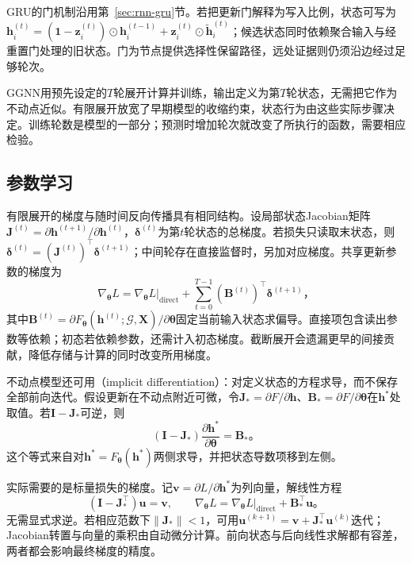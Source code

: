 GRU的门机制沿用第~\ref{sec:rnn-gru}节。若把更新门解释为写入比例，状态可写为$\bm{h}_i^{(t)}=(\bm{1}-\bm{z}_i^{(t)})\odot\bm{h}_i^{(t-1)}+\bm{z}_i^{(t)}\odot\widetilde{\bm{h}}_i^{(t)}$；候选状态同时依赖聚合输入与经重置门处理的旧状态。门为节点提供选择性保留路径，远处证据则仍须沿边经过足够轮次。

GGNN用预先设定的$T$轮展开计算并训练，输出定义为第$T$轮状态，无需把它作为不动点近似。有限展开放宽了早期模型的收缩约束，状态行为由这些实际步骤决定。训练轮数是模型的一部分；预测时增加轮次就改变了所执行的函数，需要相应检验。

\subsection{参数学习}
\label{sec:gnn-recurrent-learning}

有限展开的梯度与随时间反向传播具有相同结构。设局部状态Jacobian矩阵$\bm{J}^{(t)}=\partial\bm{h}^{(t+1)}/\partial\bm{h}^{(t)}$，$\bm{\delta}^{(t)}$为第$t$轮状态的总梯度。若损失只读取末状态，则$\bm{\delta}^{(t)}=(\bm{J}^{(t)})^{\top}\bm{\delta}^{(t+1)}$；中间轮存在直接监督时，另加对应梯度。共享更新参数的梯度为
\begin{equation}
  \nabla_{\bm{\theta}}L
    =\left.\nabla_{\bm{\theta}}L\right|_{\mathrm{direct}}
      +\sum_{t=0}^{T-1}(\bm{B}^{(t)})^{\top}\bm{\delta}^{(t+1)}\text{，}
  \label{eq:gnn-recurrent-gradient}
\end{equation}
其中$\bm{B}^{(t)}=\partial F_{\bm{\theta}}(\bm{h}^{(t)};\mathcal{G},\bm{X})/\partial\bm{\theta}$固定当前输入状态求偏导。直接项包含读出参数等依赖；初态若依赖参数，还需计入初态梯度。截断展开会遗漏更早的间接贡献，降低存储与计算的同时改变所用梯度。

不动点模型还可用（implicit differentiation）：对定义状态的方程求导，而不保存全部前向迭代。假设更新在不动点附近可微，令$\bm{J}_*=\partial F/\partial\bm{h}$、$\bm{B}_*=\partial F/\partial\bm{\theta}$在$\bm{h}^*$处取值。若$\bm{I}-\bm{J}_*$可逆，则
\begin{equation}
  (\bm{I}-\bm{J}_*)\frac{\partial\bm{h}^*}{\partial\bm{\theta}}
    =\bm{B}_*\text{。}
  \label{eq:gnn-implicit-state-gradient}
\end{equation}
这个等式来自对$\bm{h}^*=F_{\bm{\theta}}(\bm{h}^*)$两侧求导，并把状态导数项移到左侧。

实际需要的是标量损失的梯度。记$\bm{v}=\partial L/\partial\bm{h}^*$为列向量，解线性方程
\begin{equation}
  (\bm{I}-\bm{J}_*^{\top})\bm{u}=\bm{v},\qquad
  \nabla_{\bm{\theta}}L
    =\left.\nabla_{\bm{\theta}}L\right|_{\mathrm{direct}}+\bm{B}_*^{\top}\bm{u}\text{。}
  \label{eq:gnn-implicit-loss-gradient}
\end{equation}
无需显式求逆。若相应范数下$\lVert\bm{J}_*\rVert<1$，可用$\bm{u}^{(k+1)}=\bm{v}+\bm{J}_*^{\top}\bm{u}^{(k)}$迭代；Jacobian转置与向量的乘积由自动微分计算。前向状态与后向线性求解都有容差，两者都会影响最终梯度的精度。


